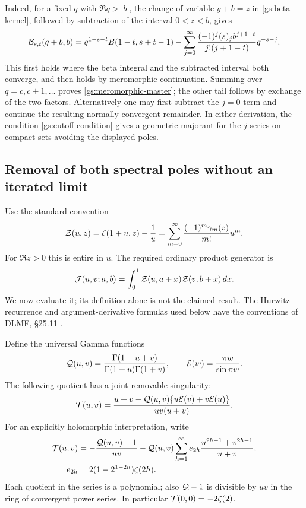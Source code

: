 Indeed, for a fixed $q$ with $\Re q>|b|$, the change of variable
$y+b=z$ in \eqref{gs:beta-kernel}, followed by subtraction of the
interval $0<z<b$, gives
\begin{equation}\label{gs:strip-evaluation}
 \mathcal B_{s,t}(q+b,b)=q^{1-s-t}B(1-t,s+t-1)
 -\sum_{j=0}^\infty
 \frac{(-1)^j(s)_j b^{j+1-t}}{j!(j+1-t)}q^{-s-j}.
\end{equation}
This first holds where the beta integral and the subtracted interval
both converge, and then holds by meromorphic continuation.  Summing
over $q=c,c+1,\ldots$ proves \eqref{gs:meromorphic-master}; the other
tail follows by exchange of the two factors.  Alternatively one may
first subtract the $j=0$ term and continue the resulting normally
convergent remainder.  In either derivation, the condition
\eqref{gs:cutoff-condition} gives a geometric majorant for the
$j$-series on compact sets avoiding the displayed poles.

\subsection{Removal of both spectral poles without an iterated limit}

Use the standard convention
\begin{equation}\label{gs:stieltjes-convention}
 \mathcal Z(u,z)=\zeta(1+u,z)-\frac1u
 =\sum_{m=0}^\infty\frac{(-1)^m\gamma_m(z)}{m!}u^m.
\end{equation}
For $\Re z>0$ this is entire in $u$.  The required ordinary product
generator is
\begin{equation}\label{gs:target-master}
 \mathcal J(u,v;a,b)=\int_0^1\mathcal Z(u,a+x)\mathcal Z(v,b+x)\,dx.
\end{equation}
We now evaluate it; its definition alone is not the claimed result.
The Hurwitz recurrence and argument-derivative formulas used below
have the conventions of DLMF, \S25.11 \cite{DLMF}.

Define the universal Gamma functions
\[
 \mathcal Q(u,v)=\frac{\Gamma(1+u+v)}{\Gamma(1+u)\Gamma(1+v)},
 \qquad \mathcal E(w)=\frac{\pi w}{\sin\pi w}.
\]
The following quotient has a joint removable singularity:
\begin{equation}\label{gs:universal-quotient}
 \mathcal T(u,v)=
 \frac{u+v-\mathcal Q(u,v)\{u\mathcal E(v)+v\mathcal E(u)\}}
 {uv(u+v)}.
\end{equation}
For an explicitly holomorphic interpretation, write
\begin{align}
 \mathcal T(u,v)&=-\frac{\mathcal Q(u,v)-1}{uv}
 -\mathcal Q(u,v)\sum_{h=1}^\infty e_{2h}
       \frac{u^{2h-1}+v^{2h-1}}{u+v},\label{gs:universal-holomorphic}\\
 e_{2h}&=2(1-2^{1-2h})\zeta(2h).
\end{align}
Each quotient in the series is a polynomial; also
$\mathcal Q-1$ is divisible by $uv$ in the ring of convergent power
series.  In particular $\mathcal T(0,0)=-2\zeta(2)$.

